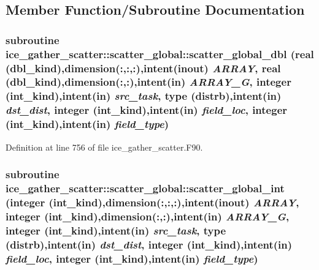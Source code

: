 \subsection{Member Function/Subroutine Documentation}
\hypertarget{interfaceice__gather__scatter_1_1scatter__global_ab3f5554c0499b5d48c352b2d83059931}{
\subsubsection[{scatter\_\-global\_\-dbl}]{\setlength{\rightskip}{0pt plus 5cm}subroutine ice\_\-gather\_\-scatter::scatter\_\-global::scatter\_\-global\_\-dbl (real (dbl\_\-kind),dimension(:,:,:),intent(inout) {\em ARRAY}, \/  real (dbl\_\-kind),dimension(:,:),intent(in) {\em ARRAY\_\-G}, \/  integer (int\_\-kind),intent(in) {\em src\_\-task}, \/  type ({\bf distrb}),intent(in) {\em dst\_\-dist}, \/  integer (int\_\-kind),intent(in) {\em field\_\-loc}, \/  integer (int\_\-kind),intent(in) {\em field\_\-type})}}
\label{interfaceice__gather__scatter_1_1scatter__global_ab3f5554c0499b5d48c352b2d83059931}


Definition at line 756 of file ice\_\-gather\_\-scatter.F90.\hypertarget{interfaceice__gather__scatter_1_1scatter__global_af90f731e0b76882ffbf0031b43a1f379}{
\subsubsection[{scatter\_\-global\_\-int}]{\setlength{\rightskip}{0pt plus 5cm}subroutine ice\_\-gather\_\-scatter::scatter\_\-global::scatter\_\-global\_\-int (integer (int\_\-kind),dimension(:,:,:),intent(inout) {\em ARRAY}, \/  integer (int\_\-kind),dimension(:,:),intent(in) {\em ARRAY\_\-G}, \/  integer (int\_\-kind),intent(in) {\em src\_\-task}, \/  type ({\bf distrb}),intent(in) {\em dst\_\-dist}, \/  integer (int\_\-kind),intent(in) {\em field\_\-loc}, \/  integer (int\_\-kind),intent(in) {\em field\_\-type})}}
\label{interfaceice__gather__scatter_1_1scatter__global_af90f731e0b76882ffbf0031b43a1f379}


